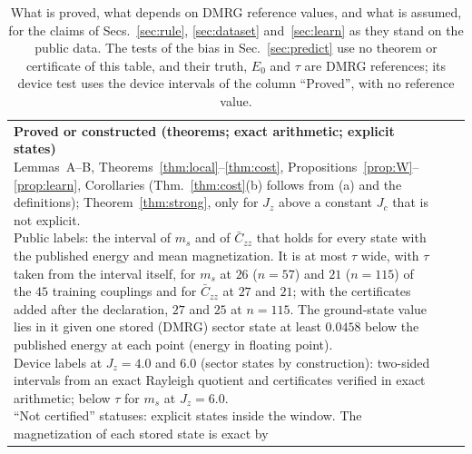 \documentclass[aps,prx,twocolumn,10pt,superscriptaddress,nofootinbib,longbibliography,floatfix]{revtex4-2}
\theoremstyle{remark}
\newcommand{\Jz}{J_z}
\newcommand{\ms}{m_s}
\newcommand{\Czz}{\bar C_{zz}}
\begin{document}
\begin{table}[t]
\caption{\label{tab:status}What is proved, what depends on DMRG reference values, and what is assumed, for the claims
of Secs.~\ref{sec:rule}, \ref{sec:dataset} and~\ref{sec:learn} as they stand on the public data. The tests of the bias in Sec.~\ref{sec:predict} use no theorem or certificate of this table, and their truth,
$E_0$ and $\tau$ are DMRG references; its device test uses the device intervals of the column ``Proved'', with no
reference value.}
\begin{ruledtabular}
\begin{tabular}{lll}
\parbox[t]{0.50\textwidth}{\textbf{Proved or constructed (theorems; exact arithmetic; explicit states)}\\[2pt] %
Lemmas~A--B, Theorems~\ref{thm:local}--\ref{thm:cost}, Propositions~\ref{prop:W}--\ref{prop:learn}, Corollaries
(Thm.~\ref{thm:cost}(b) follows from (a) and the definitions); Theorem~\ref{thm:strong}, only for $\Jz$ above a
constant $J_c$ that is not explicit.\\
Public labels: the interval of $\ms$ and of $\Czz$ that holds for every state with the published energy and mean
magnetization. It is at most $\tau$ wide, with $\tau$ taken from the interval itself, for $\ms$ at $26$ ($n=57$) and %
$21$ ($n=115$) of the $45$ training couplings and for $\Czz$ at $27$ and $21$; with the certificates added after the %
declaration, $27$ and $25$ at $n=115$. The ground-state value lies in it given one stored (DMRG) sector state %
at least $0.0458$ below the published energy at each point (energy in floating point).\\ %
Device labels at $\Jz=4.0$ and $6.0$ (sector states by construction): two-sided intervals from an exact Rayleigh quotient and certificates verified %
in exact arithmetic; below $\tau$ for $\ms$ at $\Jz=6.0$.\\ %
``Not certified'' statuses: explicit states inside the window. The magnetization of each stored state is exact by
}
\end{tabular}
\end{ruledtabular}
\end{table}
\end{document}
